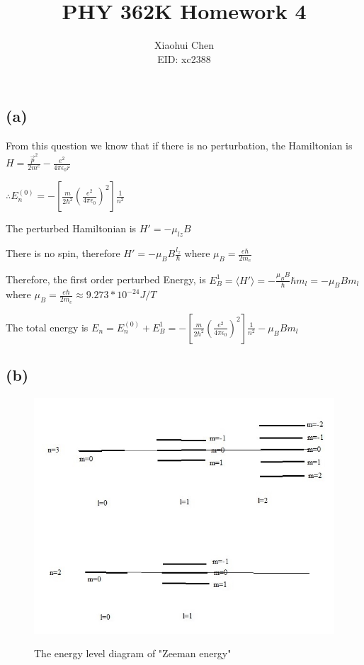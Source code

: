 \documentclass[12pt]{article}
\author{Xiaohui Chen \\EID: xc2388}
\title{PHY 362K Homework 4}
\begin{document}
\maketitle
\begin{spacing}{2.0}

\section{} %

\subsection*{(a)}

From this question we know that if there is no perturbation, the Hamiltonian is $H=\frac{\vec{p}^2}{2m^e}- \frac{e^2}{4\pi \epsilon_0 r}$

$\therefore E_n^{(0)}=-\left[ \frac{m}{2\hbar^2} \left( \frac{e^2}{4\pi\epsilon_0} \right)^2 \right] \frac{1}{n^2}$

The perturbed Hamiltonian is $H'=-\mu_{lz}B$

There is no spin, therefore $H'=-\mu_B B\frac{l_z}{\hbar}$ where $\mu_B = \frac{e\hbar}{2m_e}$

Therefore, the first order perturbed Energy, is $E_B^1= \langle H' \rangle = -\frac{\mu_B B}{\hbar} \hbar m_l = -\mu_B B m_l$ where $\mu_B = \frac{e\hbar}{2m_e} \approx 9.273*10^{-24} J/T$

The total energy is $E_{n}= E_n^{(0)}+E_B^1 = -\left[ \frac{m}{2\hbar^2} \left( \frac{e^2}{4\pi\epsilon_0} \right)^2 \right] \frac{1}{n^2} -\mu_B B m_l $

\subsection*{(b)}

\begin{figure}
  \centering
  \includegraphics[width=6in]{out1}\\
  \caption{The energy level diagram of "Zeeman energy"}\label{out1}
\end{figure}


\end{spacing}
\end{document}
